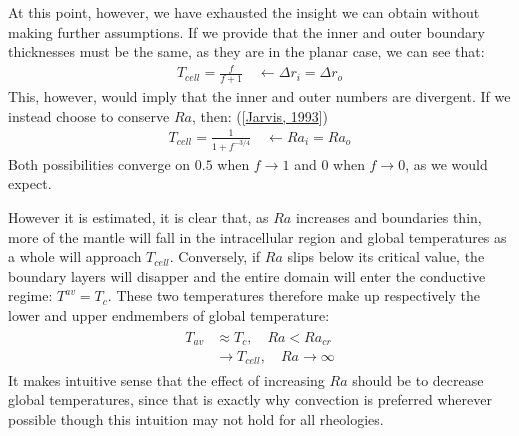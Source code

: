 \documentclass[letterpaper,10pt,english]{jupyterBook}
\begin{document}
\sphinxAtStartPar
At this point, however, we have exhausted the insight we can obtain without making further assumptions. If we provide that the inner and outer boundary thicknesses must be the same, as they are in the planar case, we can see that:
\begin{equation*}
\begin{split}
T_{cell} = \frac{f}{f + 1} \quad \leftarrow {\Delta r}_i = {\Delta r}_o
\end{split}
\end{equation*}
\sphinxAtStartPar
This, however, would imply that the inner and outer  numbers are divergent. If we instead choose to conserve \(Ra\), then: ({[}\hyperlink{cite.references:id442}{Jarvis, 1993}{]})
\begin{equation*}
\begin{split}
T_{cell} = \frac{1}{1 + f^{-3/4}} \quad \leftarrow Ra_i = Ra_o
\end{split}
\end{equation*}
\sphinxAtStartPar
Both possibilities converge on \(0.5\) when \(f\to1\) and \(0\) when \(f\to0\), as we would expect.

\sphinxAtStartPar
However it is estimated, it is clear that, as \(Ra\) increases and boundaries thin, more of the mantle will fall in the intracellular region and global temperatures as a whole will approach \(T_{cell}\). Conversely, if \(Ra\) slips below its critical value, the boundary layers will disapper and the entire domain will enter the conductive regime: \(T^{av} = T_{c}\). These two temperatures therefore make up respectively the lower and upper endmembers of global temperature:
\begin{equation*}
\begin{split} \begin{align*}
T_{av} &\approx T_{c}, \quad Ra < Ra_{cr} \\
&\to T_{cell}, \quad Ra \to \infty
\end{align*} \end{split}
\end{equation*}
\sphinxAtStartPar
It makes intuitive sense that the effect of increasing \(Ra\) should be to decrease global temperatures, since that is exactly why convection is preferred wherever possible \sphinxhyphen{} though this intuition may not hold for all rheologies.
\end{document}
